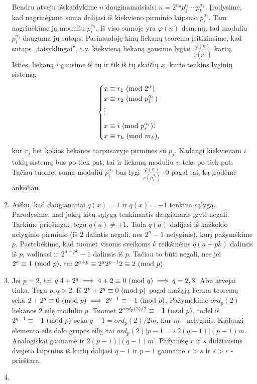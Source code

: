 \begin{enumerate}
Bendru atveju išskaidykime $n$ dauginamaisiais: $n=2^{\alpha_0}p_1^{\alpha_1}\cdots
p_k^{\alpha_k}$. Įrodysime, kad nagrinėjama suma dalijasi iš kiekvieno
pirminio laipsnio $p_i^{\alpha_i}$. Tam nagrinėkime ją moduliu
$p_i^{\alpha_i}$. Iš viso sumoje yra $\varphi(n)$ dėmenų, tad moduliu
$p_i^{\alpha_i}$ dauguma jų sutaps. Pasinaudoję kinų liekanų teorema
įsitikinsime, kad sutaps „taisyklingai'', t.y. kiekvieną liekaną
gausime lygiai $\frac{\varphi(n)}{\varphi(p_i^{\alpha_i})}$ kartų.
Išties, liekaną $i$ gausime iš tų ir tik iš tų skaičių $x$, kurie tenkins lyginių
sistemą: 
$$\begin{cases}
  x \equiv r_1 \ (\text{mod } 2^{\alpha})\\
  x \equiv r_2 \ (\text{mod } p_1^{\alpha_1})\\
  \vdots\\
  x \equiv i \ (\text{mod } p_i^{\alpha_i})
  \vdots\\
  x \equiv r_k \ (\text{mod } m_k),
\end{cases}$$
kur $r_j$ bet kokios liekanos tarpusavyje pirminės su $p_j$. Kadangi
kiekvienam $i$ tokių sistemų bus po tiek pat, tai ir liekanų moduliu
$n$ teks po tiek pat. Tačiau tuomet suma moduliu $p_i^{\alpha_i}$ bus
lygi $\frac{\varphi(n)}{\varphi(p_i^{\alpha_i})}\cdot 0$ pagal tai, ką
įrodėme anksčiau.
\item 
Aišku, kad daugianariai $q(x)=1$ ir $q(x)=-1$ tenkina sąlygą. Parodysime, kad jokių
kitų sąlygą tenkinantis daugianaris įgyti negali. Tarkime priešingai,
tegu $q(a) \neq \pm 1$. Tada $q(a)$ dalijasi iš kažkokio nelyginio
pirminio (iš $2$ dalintis negali, nes $2^n - 1$ nelyginis), kurį
pažymėkime $p$. Pastebėkime, kad tuomet visoms sveikoms $k$ reikšmėms
$q(a+pk)$ dalinsis iš $p$, vadinasi ir $2^{a+pk} - 1$ dalinsis iš $p$. Tačiau
to būti negali, nes jei $2^a \equiv 1 \ (\text{mod } p)$, tai $2^{a+p} \equiv
2^a2^{p-1}2 \equiv 2 \ (\text{mod } p)$.
\item 
Jei $p=2$, tai $q|4 + 2^q \implies 4 + 2 \equiv 0 \ (\text{mod } q) \implies
q=2,3.$ Abu atvejai tinka. 
Tegu $p,q > 2$. Iš $2^p + 2^q \equiv 0 \ (\text{mod } p)$ pagal mažąją Ferma teoremą seka
$2 + 2^q \equiv 0 \ (\text{mod } p) \implies 2^{q-1} \equiv -1\ (\text{mod } p)$. Pažymėkime
$ord_p(2)$ liekanos $2$ eilę moduliu $p$. Tuomet $2^{ord_p(2)/2} \equiv
-1\ (\text{mod } p)$, todėl iš $2^{q-1} \equiv -1\ (\text{mod } p)$ seka $q-1 = ord_p(2)/2m$, kur
$m$ - nelyginis. Kadangi elemento eilė dalo grupės eilę, tai
$ord_p(2)|p-1 \implies 2(q-1)|(p-1)m$. Analogiškai gauname ir
$2(p-1)|(q-1)m$'. Pažymėję $r$ ir $s$ didžiausius dvejeto laipsnius iš
kurių dalijasi $q-1$ ir $p-1$ gauname $r > s$ ir $s > r$ - prieštara.  
\item 

\end{enumerate}
